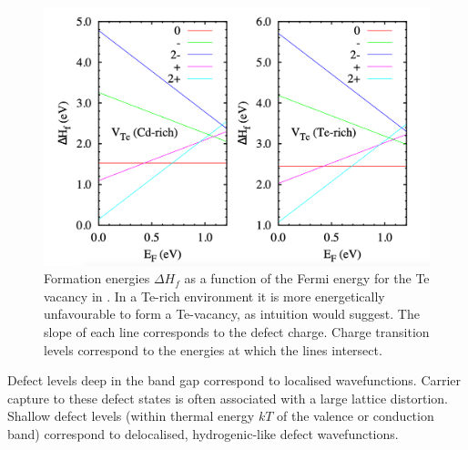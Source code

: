 \begin{figure}[h]
\centering
  \includegraphics[width=1.0\columnwidth]{figures/ch3/defectenergetics.png}
  \caption[Formation energies of the Te vacancy in CdTe]{Formation energies $\Delta H_f$ as a function of the Fermi energy for the Te vacancy in . In a Te-rich environment it is more energetically unfavourable to form a Te-vacancy, as intuition would suggest. The slope of each line corresponds to the defect charge. Charge transition levels correspond to the energies at which the lines intersect.}
\end{figure}%

Defect levels deep in the band gap correspond to localised wavefunctions. Carrier capture to these defect states is often associated with a large lattice distortion. Shallow defect levels (within thermal energy $kT$ of the valence or conduction band) correspond to delocalised, hydrogenic-like defect wavefunctions. 



